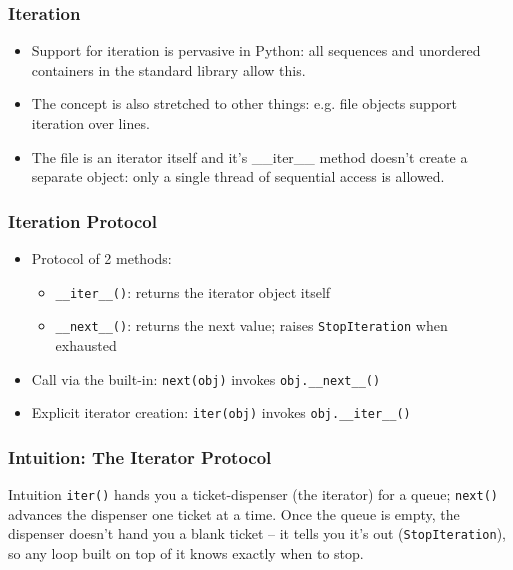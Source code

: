 \begin{frame}[fragile]\frametitle{Iteration}
    \begin{itemize}
\item Support for iteration is pervasive in Python: all sequences and unordered containers in the standard library allow this. 
\item The concept is also stretched to other things: e.g. file objects support iteration over lines.
\item The file is an iterator itself and it's \_\_iter\_\_ method doesn't create a separate object: only a single thread of sequential access is allowed.
    \end{itemize}
\end{frame}



\begin{frame}[fragile]\frametitle{Iteration Protocol}
    \begin{itemize}
    \item Protocol of 2 methods:
    \begin{itemize}
    	\item \lstinline|__iter__()|: returns the iterator object itself
	\item \lstinline|__next__()|: returns the next value; raises \lstinline|StopIteration| when exhausted
        \end{itemize}
        \item Call via the built-in: \lstinline|next(obj)| invokes \lstinline|obj.__next__()|
        \item Explicit iterator creation: \lstinline|iter(obj)| invokes \lstinline|obj.__iter__()|
    \end{itemize}
\end{frame}

\begin{frame}[fragile]\frametitle{Intuition: The Iterator Protocol}
\begin{block}{Intuition}
\lstinline|iter()| hands you a ticket-dispenser (the iterator) for a queue; \lstinline|next()|
advances the dispenser one ticket at a time. Once the queue is empty, the dispenser doesn't hand
you a blank ticket -- it tells you it's out (\lstinline|StopIteration|), so any loop built on
top of it knows exactly when to stop.
\end{block}
\end{frame}

